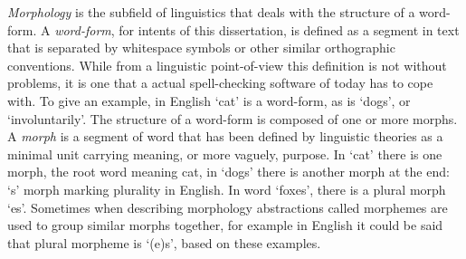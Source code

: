\documentclass[officiallayout]{unihelcompling}
\begin{document}
\emph{Morphology} is the subfield of linguistics that deals with the structure
of a word-form. A \emph{word-form}, for intents of this dissertation, is
defined as a segment in text that is separated by whitespace symbols or other
similar orthographic conventions. While from a linguistic point-of-view this
definition is not without problems, it is one that a actual spell-checking
software of today has to cope with. To give an example, in English `cat'
is a word-form, as is `dogs', or `involuntarily'. The structure
of a word-form is composed of one or more morphs. A \emph{morph} is a segment
of word that has been defined by linguistic theories as a minimal unit carrying
meaning, or more vaguely, purpose. In `cat' there is one morph, the
root word meaning cat, in `dogs' there is another morph at the end:
`s' morph marking plurality in English. In word `foxes', there
is a plural morph `es'. Sometimes when describing morphology abstractions
called morphemes are used to group similar morphs together, for example in
English it could be said that plural morpheme is `(e)s', based on these
examples.
\end{document}
